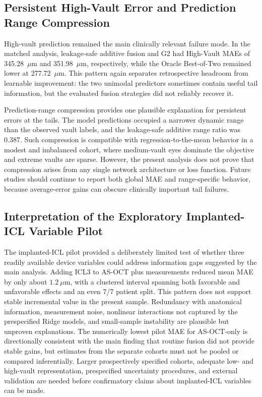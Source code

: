 \documentclass[10pt,twocolumn]{article}
\begin{document}
\subsection{Persistent High-Vault Error and Prediction Range Compression}

High-vault prediction remained the main clinically relevant failure mode. In the matched analysis, leakage-safe additive fusion and G2 had High-Vault MAEs of 345.28~$\mu$m and 351.98~$\mu$m, respectively, while the Oracle Best-of-Two remained lower at 277.72~$\mu$m. This pattern again separates retrospective headroom from learnable improvement: the two unimodal predictors sometimes contain useful tail information, but the evaluated fusion strategies did not reliably recover it.

Prediction-range compression provides one plausible explanation for persistent errors at the tails. The model predictions occupied a narrower dynamic range than the observed vault labels, and the leakage-safe additive range ratio was 0.387. Such compression is compatible with regression-to-the-mean behavior in a modest and imbalanced cohort, where medium-vault eyes dominate the objective and extreme vaults are sparse. However, the present analysis does not prove that compression arises from any single network architecture or loss function. Future studies should continue to report both global MAE and range-specific behavior, because average-error gains can obscure clinically important tail failures.

\subsection{Interpretation of the Exploratory Implanted-ICL Variable Pilot}

The implanted-ICL pilot provided a deliberately limited test of whether three readily available device variables could address information gaps suggested by the main analysis. Adding ICL3 to AS-OCT plus measurements reduced mean MAE by only about $1.2~\mu$m, with a clustered interval spanning both favorable and unfavorable effects and an even 7/7 patient split. This pattern does not support stable incremental value in the present sample. Redundancy with anatomical information, measurement noise, nonlinear interactions not captured by the prespecified Ridge models, and small-sample instability are plausible but unproven explanations. The numerically lowest pilot MAE for AS-OCT-only is directionally consistent with the main finding that routine fusion did not provide stable gains, but estimates from the separate cohorts must not be pooled or compared inferentially. Larger prospectively specified cohorts, adequate low- and high-vault representation, prespecified uncertainty procedures, and external validation are needed before confirmatory claims about implanted-ICL variables can be made.
\end{document}

